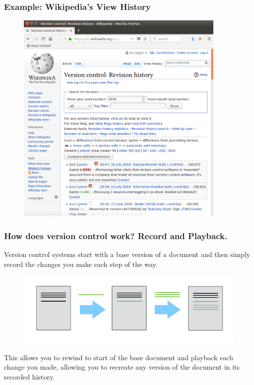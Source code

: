 \documentclass{beamer}
\begin{document}
\begin{frame}
   \frametitle{Example: Wikipedia's View History}
   \begin{figure}[htbp]
      \includegraphics[width=0.9\textwidth]{images/revision-history-wikipedia.png}
   \end{figure}
\end{frame}

\begin{frame}
   \frametitle{How does version control work? Record and Playback.}
   Version control systems start with a base version of a document and
   then simply record the changes you make each step of the way.
   \begin{figure}[htbp]
      \includegraphics[width=1.0\textwidth]{images/play-changes.png}
   \end{figure}
   This allows you to rewind to start of the base document and playback
   each change you made, allowing you to recreate any version of the 
   document in its recorded history. 
\end{frame}
\end{document}
